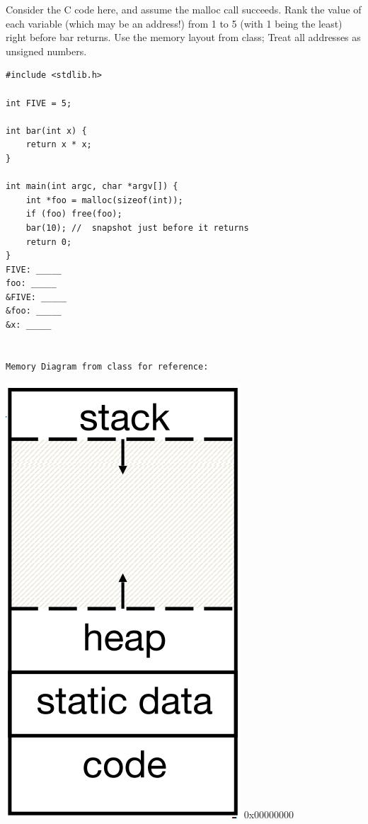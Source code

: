 
\begin{blocksection}
\question
Consider the C code here, and assume the malloc call succeeds. Rank the value of each variable (which may be an address!) from 1 to 5 (with 1 being the least) right before bar returns.  Use the memory layout from class;  Treat all addresses as unsigned numbers. 

\begin{verbatim}
#include <stdlib.h> 

int FIVE = 5;

int bar(int x) {
    return x * x;
}

int main(int argc, char *argv[]) { 	
    int *foo = malloc(sizeof(int)); 	
    if (foo) free(foo); 	
    bar(10); //  snapshot just before it returns 	
    return 0; 
}
FIVE: _____
foo: _____
&FIVE: _____
&foo: _____
&x: _____


Memory Diagram from class for reference:
\end{verbatim}
\includegraphics[scale = 0.35]{topics/c/memorydiagram.png}
0x00000000
\end{blocksection}
